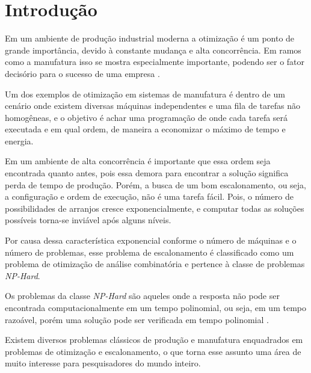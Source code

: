 \chapter{Introdução}
    Em um ambiente de produção industrial moderna a otimização é um ponto de grande importância, devido à constante mudança e alta concorrência. Em ramos como a manufatura isso se mostra especialmente importante, podendo ser o fator decisório para o sucesso de uma empresa \cite{Wari2016}.\hfill\vspace{\onelineskip}
    
    Um dos exemplos de otimização em sistemas de manufatura é dentro de um cenário onde existem diversas máquinas independentes e uma fila de tarefas não homogêneas, e o objetivo é achar uma programação de onde cada tarefa será executada e em qual ordem, de maneira a economizar o máximo de tempo e energia.\hfill\vspace{\onelineskip}

    Em um ambiente de alta concorrência é importante que essa ordem seja encontrada quanto antes, pois essa demora para encontrar a solução significa perda de tempo de produção. Porém, a busca de um bom escalonamento, ou seja, a configuração e ordem de execução, não é uma tarefa fácil. Pois, o número de possibilidades de arranjos cresce exponencialmente, e computar todas as soluções possíveis torna-se inviável após alguns níveis.\hfill\vspace{\onelineskip}

    Por causa dessa característica exponencial conforme o número de máquinas e o número de problemas, esse problema de escalonamento é classificado como um problema de otimização de análise combinatória e pertence à classe de problemas \textit{NP-Hard}.\hfill\vspace{\onelineskip}

    Os problemas da classe \textit{NP-Hard} são aqueles onde a resposta não pode ser encontrada computacionalmente em um tempo polinomial, ou seja, em um tempo razoável, porém uma solução pode ser verificada em tempo polinomial \cite{Eswaramurthy2008}.\hfill\vspace{\onelineskip}

    Existem diversos problemas clássicos de produção e manufatura enquadrados em problemas de otimização e escalonamento, o que torna esse assunto uma área de muito interesse para pesquisadores do mundo inteiro.\hfill\vspace{\onelineskip}

